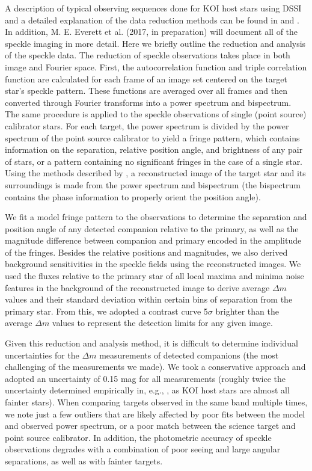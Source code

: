 \documentclass[twocolumn,appendixfloats]{aastex6}
\begin{document}
A description of typical observing sequences done for KOI host stars using DSSI 
and a detailed explanation of the data reduction methods can be found in 
\citet{horch11} and \citet{howell11}. In addition, M. E. Everett et al. (2017, in 
preparation) will document all of the speckle imaging in more detail.
Here we briefly outline the reduction and analysis of the speckle data.
The reduction of speckle observations takes place in both image and Fourier 
space. First, the autocorrelation function and triple correlation function are 
calculated for each frame of an image set centered on the target star's speckle 
pattern. These functions are averaged over all frames and then converted 
through Fourier transforms into a power spectrum and bispectrum. The same 
procedure is applied to the speckle observations of single (point source) 
calibrator stars. For each target, the power spectrum is divided by the power 
spectrum of the point source calibrator to yield a fringe pattern, which contains 
information on the separation, relative position angle, and brightness of any 
pair of stars, or a pattern containing no significant fringes in the case of a 
single star. Using the methods described by \citet{meng90}, a reconstructed 
image of the target star and its surroundings is made from the power spectrum 
and bispectrum (the bispectrum contains the phase information to properly
orient the position angle).

We fit a model fringe pattern to the observations to determine the separation 
and position angle of any detected companion relative to the primary, as well as 
the magnitude difference between companion and primary encoded in the amplitude 
of the fringes. Besides the relative positions and magnitudes, we also derived 
background sensitivities in the speckle fields using the reconstructed images. 
We used the fluxes relative to the primary star of all local maxima and minima 
noise features in the background of the reconstructed image to derive average 
$\Delta m$ values and their standard deviation within certain bins of separation 
from the primary star. From this, we adopted a contrast curve 5$\sigma$ brighter 
than the average $\Delta m$ values to represent the detection limits for any
given image.

Given this reduction and analysis method, it is difficult to determine
individual uncertainties for the $\Delta m$ measurements of detected
companions (the most challenging of the measurements we made). We took 
a conservative approach and adopted an uncertainty of 0.15 mag for all
measurements (roughly twice the uncertainty determined empirically in,
e.g., \citealt{horch11}, as KOI host stars are almost all fainter stars). When
comparing targets observed in the same band multiple times, we note
just a few outliers that are likely affected by poor fits between the model 
and observed power spectrum, or a poor match between the science
target and point source calibrator. In addition, the photometric accuracy 
of speckle observations degrades with a combination of poor seeing and 
large angular separations, as well as with fainter targets.
\end{document}
